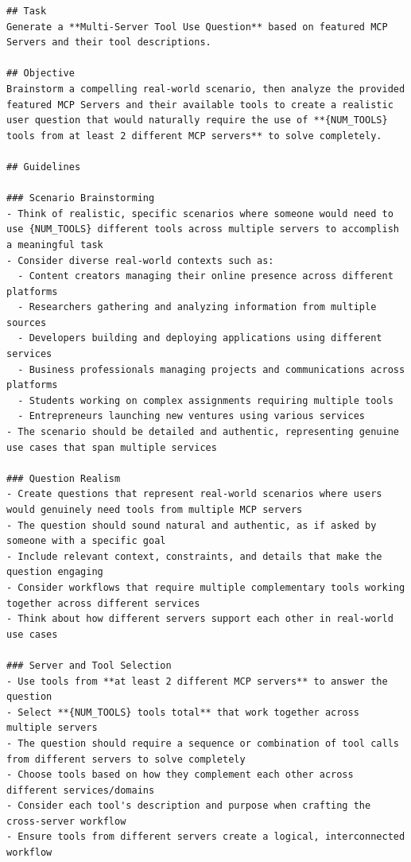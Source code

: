\begin{verbatim}
## Task
Generate a **Multi-Server Tool Use Question** based on featured MCP Servers and their tool descriptions.

## Objective
Brainstorm a compelling real-world scenario, then analyze the provided featured MCP Servers and their available tools to create a realistic user question that would naturally require the use of **{NUM_TOOLS} tools from at least 2 different MCP servers** to solve completely.

## Guidelines

### Scenario Brainstorming
- Think of realistic, specific scenarios where someone would need to use {NUM_TOOLS} different tools across multiple servers to accomplish a meaningful task
- Consider diverse real-world contexts such as:
  - Content creators managing their online presence across different platforms
  - Researchers gathering and analyzing information from multiple sources  
  - Developers building and deploying applications using different services
  - Business professionals managing projects and communications across platforms
  - Students working on complex assignments requiring multiple tools
  - Entrepreneurs launching new ventures using various services
- The scenario should be detailed and authentic, representing genuine use cases that span multiple services

### Question Realism
- Create questions that represent real-world scenarios where users would genuinely need tools from multiple MCP servers
- The question should sound natural and authentic, as if asked by someone with a specific goal
- Include relevant context, constraints, and details that make the question engaging
- Consider workflows that require multiple complementary tools working together across different services
- Think about how different servers support each other in real-world use cases

### Server and Tool Selection
- Use tools from **at least 2 different MCP servers** to answer the question
- Select **{NUM_TOOLS} tools total** that work together across multiple servers
- The question should require a sequence or combination of tool calls from different servers to solve completely
- Choose tools based on how they complement each other across different services/domains
- Consider each tool's description and purpose when crafting the cross-server workflow
- Ensure tools from different servers create a logical, interconnected workflow


\end{verbatim}
